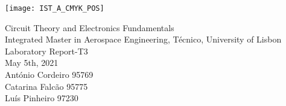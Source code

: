\thispagestyle {empty}

\texttt{[image: IST\_A\_CMYK\_POS]}

\begin{center}
%
\vspace{1.0cm}



\vspace{1cm}
{\FontLb Circuit Theory and Electronics Fundamentals} \\ 
\vspace{1cm}
{\FontSn Integrated Master in Aerospace Engineering, Técnico, University of Lisbon} \\ 
\vspace{1cm}
{\FontSn Laboratory Report-T3} \\
\vspace{1cm}
{\FontSn May 5th, 2021} \\ 
\vspace{1cm}
{\FontSn António Cordeiro 95769} \\ 
\vspace{00.5cm}
{\FontSn Catarina Falcão 95775} \\ 
\vspace{0.5cm}
{\FontSn Luís Pinheiro 97230} \\ 
\end{center}

\newpage


